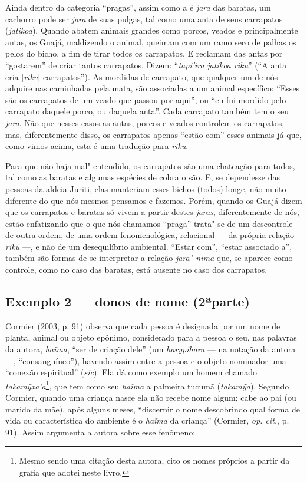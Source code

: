 Ainda dentro da categoria ``pragas'', assim como a  é \emph{jara}
das baratas, um cachorro pode ser \emph{jara} de suas pulgas, tal como
uma anta de seus carrapatos (\emph{jatikoa}). Quando abatem animais
grandes como porcos, veados e principalmente antas, os Guajá, maldizendo
o animal, queimam com um ramo seco de palhas os pelos do bicho, a fim de
tirar todos os carrapatos. E reclamam das antas por ``gostarem'' de criar
tantos carrapatos. Dizem: ``\emph{tapi'ira} \emph{jatikoa riku}'' (``A
anta cria {[}\emph{riku}{]} carrapatos''). As mordidas de carrapato, que
qualquer um de nós adquire nas caminhadas pela mata, são associadas a um
animal específico: ``Esses são os carrapatos de um veado que passou por
aqui'', ou ``eu fui mordido pelo carrapato daquele porco, ou daquela
anta''. Cada carrapato também tem o seu \emph{jara}. Não que nesses
casos as antas, porcos e veados controlem os carrapatos, mas,
diferentemente disso, os carrapatos apenas ``estão com'' esses animais já
que, como vimos acima, esta é uma tradução para \emph{riku}.

Para que não haja mal"-entendido, os carrapatos são uma chateação para
todos, tal como as baratas e algumas espécies de cobra o são. E, se
dependesse das pessoas da aldeia Juriti, elas manteriam esses bichos
(todos) longe, não muito diferente do que nós mesmos pensamos e fazemos.
Porém, quando os Guajá dizem que os carrapatos e baratas só vivem a
partir destes \emph{jaras}, diferentemente de nós, estão enfatizando que
o que nós chamamos ``praga'' trata"-se de um descontrole de outra ordem,
de uma ordem fenomenológica, relacional --- da própria relação \emph{riku}
---, e não de um desequilíbrio ambiental. ``Estar com'', ``estar associado
a'', também são formas de se interpretar a relação \emph{jara"-nima} que,
se aparece como controle, como no caso das baratas, está ausente no caso
dos carrapatos.

\subsection{Exemplo 2 --- donos de nome (2ªparte)}

\forceindent
Cormier (2003, p. 91) observa que cada pessoa é designada por um nome de
planta, animal ou objeto epônimo, considerado para a pessoa o seu, nas
palavras da autora, \emph{haĩma}, ``ser de criação dele'' (um
\emph{harypihara} --- na notação da autora ---, ``consanguíneo''), havendo
assim entre a pessoa e o objeto nominador uma ``conexão espiritual''
(\emph{sic}). Ela dá como exemplo um homem chamado
\emph{takamỹxa'a}\footnote{Mesmo sendo uma citação desta autora, cito os
  nomes próprios a partir da grafia que adotei neste livro.}, que tem
como seu \emph{haĩma} a palmeira tucumã (\emph{takamỹa}). Segundo
Cormier, quando uma criança nasce ela não recebe nome algum; cabe ao pai
(ou marido da mãe), após alguns meses, ``discernir o nome descobrindo
qual forma de vida ou característica do ambiente é o \emph{haĩma} da
criança'' (Cormier, \emph{op. cit.}, p. 91). Assim argumenta a autora sobre esse
fenômeno:

